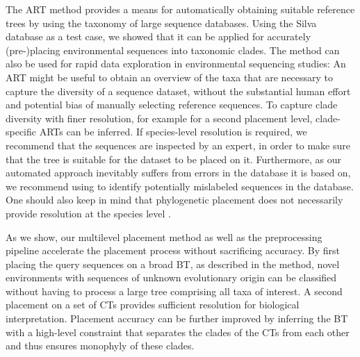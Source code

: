 The \acf{ART} method provides a means for automatically obtaining suitable reference trees
by using the taxonomy of large sequence databases.
Using the Silva database as a test case,
we showed that it can be applied for accurately (pre-)placing environmental sequences into taxonomic clades.
The method can also be used for rapid data exploration in environmental sequencing studies:
An \ac{ART} might be useful to obtain an overview of the taxa that are necessary to capture the diversity of a sequence dataset,
without the substantial human effort and potential bias of manually selecting reference sequences.
To capture clade diversity with finer resolution, for example for a second placement level,
clade-specific \acp{ART} can be inferred.
If species-level resolution is required, we recommend that the sequences are inspected by an expert,
in order to make sure that the tree is suitable for the dataset to be placed on it.
Furthermore, as our automated approach inevitably suffers from errors in the database it is based on,
we recommend using  \citep{Kozlov2016}
to identify potentially mislabeled sequences in the database.
One should also keep in mind that phylogenetic placement
does not necessarily provide resolution at the species level \citep{Dunthorn2014}.

As we show, our multilevel placement method as well as the preprocessing pipeline
accelerate the placement process without sacrificing accuracy.
By first placing the query sequences on a broad \acf{BT}, as described in the method,
novel environments with sequences of unknown evolutionary origin can be classified
without having to process a large tree comprising all taxa of interest.
A second placement on a set of \acfp{CT} provides sufficient %
resolution for biological interpretation.
Placement accuracy can be further improved by inferring the \ac{BT}
with a high-level constraint that separates the clades of the \acp{CT} from each other
and thus ensures monophyly of these clades.

